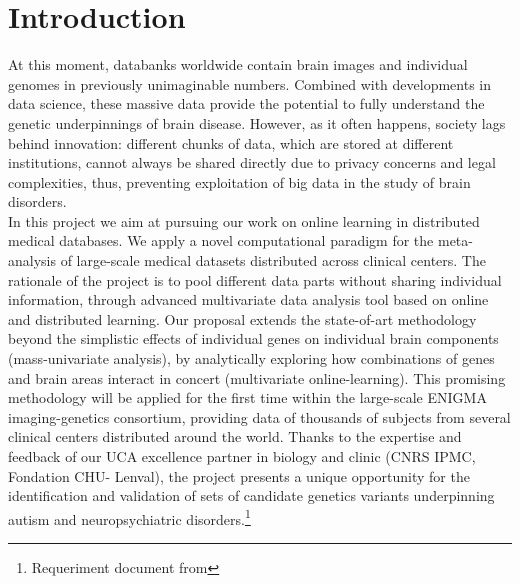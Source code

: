 \chapter*{Introduction}
\label{chap:introduction}

At this moment, databanks worldwide contain brain images and individual genomes in previously
unimaginable numbers. Combined with developments in data science, these massive data provide
the potential to fully understand the genetic underpinnings of brain disease. However, as it often
happens, society lags behind innovation: different chunks of data, which are stored at different
institutions, cannot always be shared directly due to privacy concerns and legal complexities,
thus, preventing exploitation of big data in the study of brain disorders.\\

In this project we aim at pursuing our work on online learning in distributed medical databases.
We apply a novel computational paradigm for the meta-analysis of large-scale medical datasets
distributed across clinical centers. The rationale of the project is to pool different data parts
without sharing individual information, through advanced multivariate data analysis tool based
on online and distributed learning. Our proposal extends the state-of-art methodology beyond the
simplistic effects of individual genes on individual brain components (mass-univariate analysis),
by analytically exploring how combinations of genes and brain areas interact in concert
(multivariate online-learning). This promising methodology will be applied for the first time
within the large-scale ENIGMA imaging-genetics consortium, providing data of thousands of
subjects from several clinical centers distributed around the world. Thanks to the expertise and
feedback of our UCA excellence partner in biology and clinic (CNRS IPMC, Fondation CHU-
Lenval), the project presents a unique opportunity for the identification and validation of sets of
candidate genetics variants underpinning autism and neuropsychiatric disorders.\footnote{Requeriment document from }


